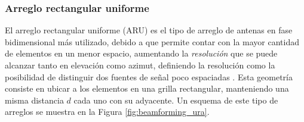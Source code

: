 \subsubsection{Arreglo rectangular uniforme}

El arreglo rectangular uniforme (ARU) es el tipo de arreglo de antenas en fase bidimensional más utilizado, debido a que permite contar con la mayor cantidad de elementos en un menor espacio, aumentando la \emph{resolución} que se puede alcanzar tanto en elevación como azimut, definiendo la resolución como la posibilidad de distinguir dos fuentes de señal poco espaciadas \cite{bib:2decadesbeamforming}. Esta geometría consiste en ubicar a los elementos en una grilla rectangular, manteniendo una misma distancia $d$ cada uno con su adyacente. Un esquema de este tipo de arreglos se muestra en la Figura \ref{fig:beamforming_ura}.

